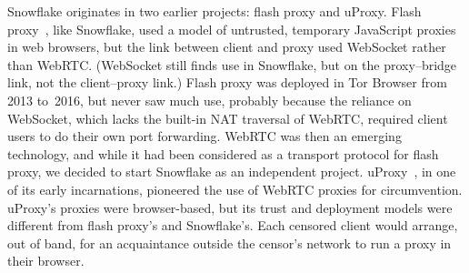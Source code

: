 \documentclass[letterpaper,twocolumn]{article}
\begin{document}
Snowflake originates in two earlier projects:
flash proxy and uProxy.
Flash proxy~\cite{Fifield2012a}, like Snowflake, used a model
of untrusted, temporary JavaScript proxies in web browsers,
but the link between client and proxy used WebSocket
rather than WebRTC.
(WebSocket still finds use in Snowflake,
but on the proxy--bridge link,
not the client--proxy link.)
Flash proxy was deployed in Tor Browser
from 2013 to~2016,
but never saw much use,
probably because the reliance on WebSocket,
which lacks the built-in NAT traversal of WebRTC,
required client users to do their own port forwarding.
WebRTC was then an emerging technology, and while
it had been considered as a transport protocol for flash proxy,
we decided to start Snowflake as an independent project.
uProxy~\cite{uproxy}, in one of its early incarnations,
pioneered the use of WebRTC proxies for circumvention.
uProxy's proxies were browser-based,
but its trust and deployment models were different
from flash proxy's and Snowflake's.
Each censored client would arrange, out of band,
for an acquaintance outside the censor's network
to run a proxy in their browser.
\end{document}
